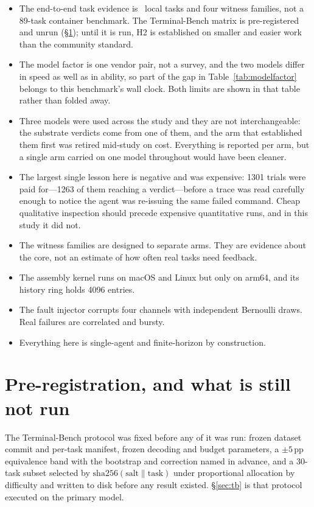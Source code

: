 \documentclass[11pt,a4paper]{article}
\begin{document}
\begin{itemize}
\item The end-to-end task evidence is \localtasks\ local tasks and four witness
families, not a 89-task container benchmark. The Terminal-Bench matrix is
pre-registered and unrun (\S\ref{sec:notrun}); until it is run, H2 is
established on smaller and easier work than the community standard.
\item The model factor is one vendor pair, not a survey, and the two models
differ in speed as well as in ability, so part of the gap in
Table~\ref{tab:modelfactor} belongs to this benchmark's wall clock. Both limits
are shown in that table rather than folded away.
\item Three models were used across the study and they are not interchangeable:
the substrate verdicts come from one of them, and the arm that established them
first was retired mid-study on cost. Everything is reported per arm, but a
single arm carried on one model throughout would have been cleaner.
\item The largest single lesson here is negative and was expensive: 1301 trials
were paid for---1263 of them reaching a verdict---before a trace was read
carefully enough to notice the agent was re-issuing the same failed command. Cheap qualitative inspection should precede
expensive quantitative runs, and in this study it did not.
\item The witness families are designed to separate arms. They are evidence
about the core, not an estimate of how often real tasks need feedback.
\item The assembly kernel runs on macOS and Linux but only on arm64, and its
history ring holds 4096 entries.
\item The fault injector corrupts four channels with independent Bernoulli
draws. Real failures are correlated and bursty.
\item Everything here is single-agent and finite-horizon by construction.
\end{itemize}

\section{Pre-registration, and what is still not run}
\label{sec:notrun}

The Terminal-Bench protocol was fixed before any of it was run: frozen dataset
commit and per-task manifest, frozen decoding and budget parameters, a
$\pm5$\,pp equivalence band with the bootstrap and correction named in advance,
and a 30-task subset selected by $\mathrm{sha256}(\text{salt} \| \text{task})$
under proportional allocation by difficulty and written to disk before any
result existed. \S\ref{sec:tb} is that protocol executed on the primary model.
\end{document}
